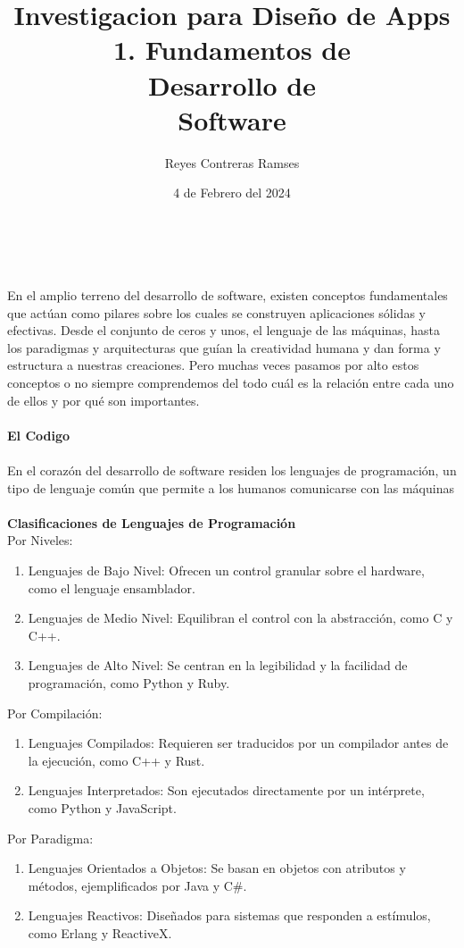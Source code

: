 \documentclass[12pt,twocolumn]{article}
\title{Investigacion para Diseño de Apps}
\author{Reyes Contreras Ramses}
\date{4 de Febrero del 2024}
\begin{document}
\maketitle
\title{\textbf{\huge 
		\\
		1. Fundamentos de 
		\\
		Desarrollo de 
		\\ 
		Software} }
\\
\\
En el amplio terreno del desarrollo de software, existen conceptos fundamentales que actúan como pilares sobre los cuales se construyen aplicaciones sólidas y efectivas. Desde el conjunto de ceros y unos, el lenguaje de las máquinas, hasta los paradigmas y arquitecturas que guían la creatividad humana y dan forma y estructura a nuestras creaciones. 
Pero muchas veces pasamos por alto estos conceptos o no siempre comprendemos del todo cuál es la relación entre cada uno de ellos y por qué son importantes.
\\
\\
\textbf{El Codigo}
\\
\\
En el corazón del desarrollo de software residen los lenguajes de programación, un tipo de lenguaje común que permite a los humanos comunicarse con las máquinas
\\
\\
\textbf{Clasificaciones de Lenguajes de Programación}
\\
Por Niveles:
\begin{enumerate}
	\item Lenguajes de Bajo Nivel: Ofrecen un control granular sobre el hardware, como el lenguaje ensamblador.
	\item Lenguajes de Medio Nivel: Equilibran el control con la abstracción, como C y C++.
	\item Lenguajes de Alto Nivel: Se centran en la legibilidad y la facilidad de programación, como Python y Ruby.
	\\
	
\end{enumerate}
Por Compilación:
\begin{enumerate}
	\item Lenguajes Compilados: Requieren ser traducidos por un compilador antes de la ejecución, como C++ y Rust.
	\item Lenguajes Interpretados: Son ejecutados directamente por un intérprete, como Python y JavaScript.
\end{enumerate}
Por Paradigma:
\begin{enumerate}
	\item Lenguajes Orientados a Objetos: Se basan en objetos con atributos y métodos, ejemplificados por Java y C\#.
	\item Lenguajes Reactivos: Diseñados para sistemas que responden a estímulos, como Erlang y ReactiveX.
\end{enumerate}
\end{document}
